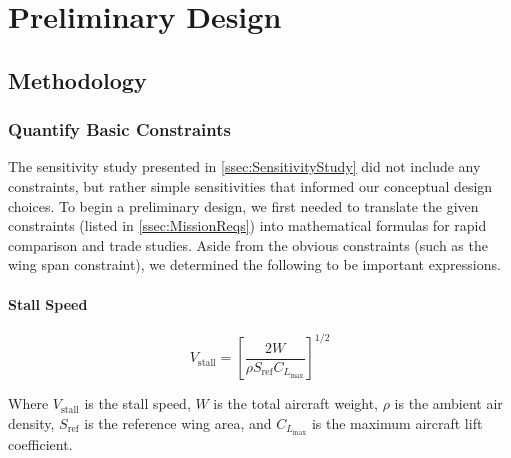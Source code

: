 \documentclass[report]{byu-aero}
\begin{document}
\clearpage
\newpage

\section{Preliminary Design} %
\label{sec:PreliminaryDesign}


\subsection{Methodology}
\label{ssec:methodology}

\subsubsection{Quantify Basic Constraints}
\label{sssec:constraints}

The sensitivity study presented in \cref{ssec:SensitivityStudy} did not include any constraints, but rather simple sensitivities that informed our conceptual design choices.  To begin a preliminary design, we first needed to translate the given constraints (listed in \cref{ssec:MissionReqs}) into mathematical formulas for rapid comparison and trade studies. Aside from the obvious constraints (such as the wing span constraint), we determined the following to be important expressions.

\paragraph{Stall Speed}

\[V_\text{stall} = \left[ \frac{2W}{\rho S_\text{ref} C_{L_\text{max}}} \right]^{1/2}\]

Where \(V_\text{stall}\) is the stall speed, \(W\) is the total aircraft weight, \(\rho\) is the ambient air density, \(S_\text{ref}\) is the reference wing area, and \(C_{L_\text{max}}\) is the maximum aircraft lift coefficient.
\end{document}
